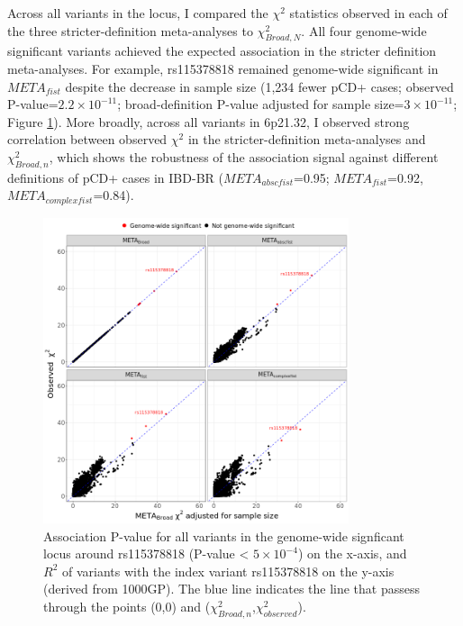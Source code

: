 Across all variants in the locus, I compared the $\chi^{2}$ statistics observed in each of the three stricter-definition meta-analyses to $\chi^{2}_{Broad,N}$. All four genome-wide significant variants achieved the expected association in the stricter definition meta-analyses. For example, rs115378818 remained genome-wide significant in $META_{fist}$ despite the decrease in sample size (1,234 fewer pCD+ cases; observed P-value=$2.2\times10^{-11}$; broad-definition P-value adjusted for sample size=$3\times10^{-11}$; Figure \ref{fig:meta_def_comparison}). More broadly, across all variants in 6p21.32, I observed strong correlation between observed $\chi^{2}$ in the stricter-definition meta-analyses and $\chi^{2}_{Broad,n}$, which shows the robustness of the association signal against different definitions of pCD+ cases in IBD-BR ($META_{abscfist}$=0.95; $META_{fist}$=0.92,$META_{complexfist}$=0.84). 

\begin{figure}[H] 
  \centering    
  \includegraphics[width=0.8\textwidth]{Vector/meta_chisq_plot}
  \caption[$\chi^{2}$ of genome-wide significant SNPs with different pCD definitions]{Association P-value for all variants in the genome-wide signficant locus around rs115378818 (P-value < $5\times10^{-4}$) on the x-axis, and $R^{2}$ of variants with the index variant rs115378818 on the y-axis (derived from 1000GP). The blue line indicates the line that passess through the points (0,0) and ($\chi^{2}_{Broad,n}$,$\chi^{2}_{observed}$).}
  \label{fig:meta_def_comparison}
  \end{figure}
